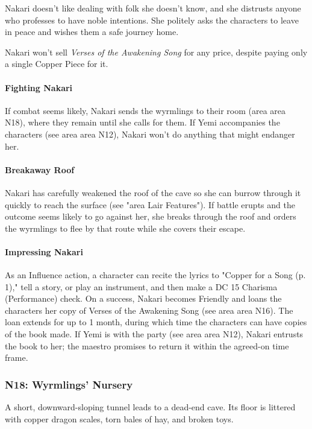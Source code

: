 \documentclass[letterpaper, 11pt, twocolumn]{dndbook}
\begin{document}
Nakari doesn't like dealing with folk she doesn't know, and she distrusts anyone who professes to have noble intentions. She politely asks the characters to leave in peace and wishes them a safe journey home.

Nakari won't sell \textit{Verses of the Awakening Song} for any price, despite paying only a single Copper Piece for it.

\paragraph{Fighting Nakari}

If combat seems likely, Nakari sends the wyrmlings to their room (area area N18), where they remain until she calls for them. If Yemi accompanies the characters (see area area N12), Nakari won't do anything that might endanger her.

\paragraph{Breakaway Roof}

Nakari has carefully weakened the roof of the cave so she can burrow through it quickly to reach the surface (see "area Lair Features"). If battle erupts and the outcome seems likely to go against her, she breaks through the roof and orders the wyrmlings to flee by that route while she covers their escape.

\paragraph{Impressing Nakari}

As an Influence action, a character can recite the lyrics to "Copper for a Song (p. 1)," tell a story, or play an instrument, and then make a DC 15 Charisma (Performance) check. On a success, Nakari becomes Friendly and loans the characters her copy of Verses of the Awakening Song (see area area N16). The loan extends for up to 1 month, during which time the characters can have copies of the book made. If Yemi is with the party (see area area N12), Nakari entrusts the book to her; the maestro promises to return it within the agreed-on time frame.

\subsubsection{N18: Wyrmlings' Nursery}

\begin{DndReadAloud}
A short, downward-sloping tunnel leads to a dead-end cave. Its floor is littered with copper dragon scales, torn bales of hay, and broken toys.
\end{DndReadAloud}
\end{document}

